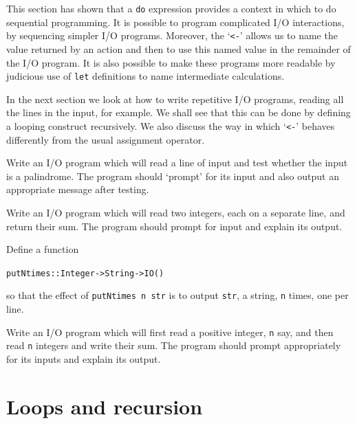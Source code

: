 \begin{summary}
This section has shown that a \texttt{do}
expression provides a context in which to do sequential programming.
It is possible to program complicated I/O interactions, by
sequencing simpler
I/O programs. Moreover, the `\texttt{<-}' allows us to name the value returned 
by an action
and then to use this named value in the remainder of the I/O program. 
It is also possible to make these
programs more readable by judicious use of \texttt{let} definitions
to name intermediate calculations.

In the next section we look at how to write repetitive I/O programs, 
reading all the lines
in the input, for example. We shall see that this can be done by
defining a looping construct recursively. We also discuss the way in
which `\texttt{<-}' behaves differently from the usual assignment
operator.
\end{summary}

\begin{exercises}

\item
Write an I/O program which will read a line of input and test whether the
input is a palindrome. The program should
`prompt' for its input and also
output an appropriate message after testing.

\item
Write an I/O program which will read two integers, each on a separate line, and return
their sum. The program should prompt for input and explain its output. 


\item
Define a function
\begin{alltt}
putNtimes :: Integer -> String -> IO ()
\end{alltt}
so that the effect of \texttt{putNtimes n str} is to output \texttt{str}, a string,  \texttt{n} times, one per line.

\item
Write an I/O program which will first read a positive integer,
\texttt{n} say, and then read \texttt{n} integers and write their sum. 
The program should prompt appropriately for its inputs and explain its output. 

\end{exercises}
\section{Loops and recursion}
\label{ioIter}

